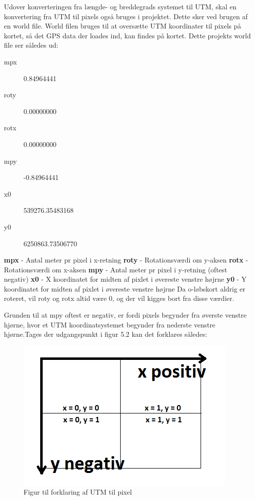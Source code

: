 Udover konverteringen fra længde- og breddegrads systemet til UTM, skal en konvertering fra UTM til pixels også bruges i projektet. Dette sker ved brugen af en world file. World filen bruges til at oversætte UTM koordinater til pixels på kortet, så det GPS data der loades ind, kan findes på kortet. Dette projekts world file ser således ud:
\begin{description}
	\item[mpx] 0.84964441
	\item[roty] 0.00000000
	\item[rotx] 0.00000000
	\item[mpy] -0.84964441
	\item[x0] 539276.35483168
	\item[y0] 6250863.73506770
\end{description}
\textbf{mpx} - Antal meter pr pixel i x-retning\newline
\textbf{roty} - Rotationsværdi om y-aksen\newline
\textbf{rotx} - Rotationsværdi om x-aksen\newline
\textbf{mpy} - Antal meter pr pixel i y-retning (oftest negativ)\newline
\textbf{x0} - X koordinatet for midten af pixlet i øvereste venstre højrne\newline
\textbf{y0} - Y koordinatet for midten af pixlet i øvereste venstre højrne\newline
Da o-løbskort aldrig er roteret, vil roty og rotx altid være 0, og der vil kigges bort fra disse værdier.

Grunden til at mpy oftest er negativ, er fordi pixels begynder fra øverste venstre hjørne, hvor et UTM koordinatsystemet begynder fra nederste venstre hjørne.Tages der udgangspunkt i figur 5.2 kan det forklares således:

\begin{figure} [h]
	\centering
	\includegraphics[width=.5\textwidth]{billeder/UTMtilPIXEL}
	\caption{Figur til forklaring af UTM til pixel}
\end{figure}


